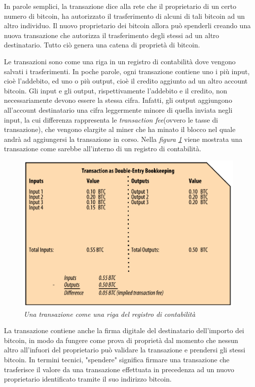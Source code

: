 In parole semplici, la transazione dice alla rete che il proprietario di un certo numero di bitcoin, ha autorizzato il trasferimento di alcuni di tali bitcoin ad un altro individuo. Il nuovo proprietario dei bitcoin allora può spenderli creando una nuova transazione che autorizza il trasferimento degli stessi ad un altro destinatario. Tutto ciò genera una catena di proprietà di bitcoin.

Le transazioni sono come una riga in un registro di contabilità dove vengono salvati i trasferimenti. In poche parole, ogni transazione contiene uno i più input, cioè l'addebito, ed uno o più output, cioè il credito aggiunto ad un altro account bitcoin. Gli input e gli output, rispettivamente l'addebito e il credito, non necessariamente devono essere la stessa cifra. Infatti, gli output aggiungono all'account destinatario una cifra leggermente minore di quella inviata negli input, la cui differenza rappresenta le \textit{transaction fee}(ovvero le tasse di transazione), che vengono elargite al miner che ha minato il blocco nel quale andrà ad aggiungersi la transazione in corso. Nella \textit{figura \ref{fig:bookkeeping}} viene mostrata una transazione come sarebbe all'interno di un registro di contabilità.
\begin{figure}[htbp]
	\centering
	\includegraphics[width=0.7 \linewidth]{figure/bookkeeping}
	\caption{\textit{Una transazione come una riga del registro di contabilità} \label{fig:bookkeeping}}
\end{figure}

La transazione contiene anche la firma digitale del destinatario dell'importo dei bitcoin, in modo da fungere come prova di proprietà dal momento che nessun altro all'infuori del proprietario può validare la transazione e prendersi gli stessi bitcoin. In termini tecnici, "spendere" significa firmare una transazione che trasferisce il valore da una transazione effettuata in precedenza ad un nuovo proprietario identificato tramite il suo indirizzo bitcoin.


